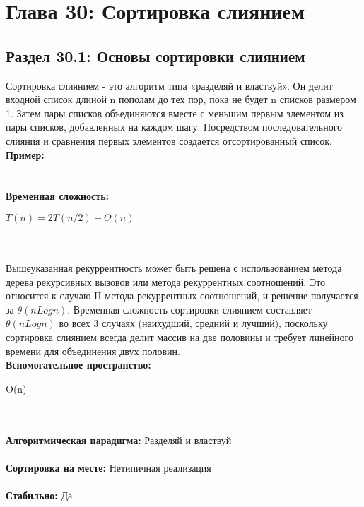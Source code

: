 \chapter*{Глава 30: Сортировка слиянием}
\section*{Раздел 30.1: Основы сортировки слиянием}
Сортировка слиянием - это алгоритм типа «разделяй и властвуй». Он делит входной список длиной n пополам до тех пор, пока не будет n списков размером 1. Затем пары списков объединяются вместе с меньшим первым элементом из пары списков, добавленных на каждом шагу. Посредством последовательного слияния и сравнения первых элементов создается отсортированный список.\\
\textbf{Пример:}\\
\\
\\
\textbf{Временная сложность:}
\colorbox{gray!6!white}{ \parbox{10em}{$T(n)= 2T(n/2) + \Theta(n)$}}\\
\\
Вышеуказанная рекуррентность может быть решена с использованием метода дерева рекурсивных вызовов или метода рекуррентных соотношений. Это относится к случаю II метода рекуррентных соотношений, и решение получается за $\theta(nLogn)$. Временная сложность сортировки слиянием составляет $\theta(nLogn)$ во всех 3 случаях (наихудший, средний и лучший), поскольку сортировка слиянием всегда делит массив на две половины и требует линейного времени для объединения двух половин.
\\
\textbf{Вспомогательное пространство:} \colorbox{gray!6!white}{ \parbox{2em}{O(n)}}\\
\\
\textbf{Алгоритмическая парадигма:} Разделяй и властвуй\\
\\
\textbf{Сортировка на месте:} Нетипичная реализация\\
\\
\textbf{Стабильно:} Да\\
